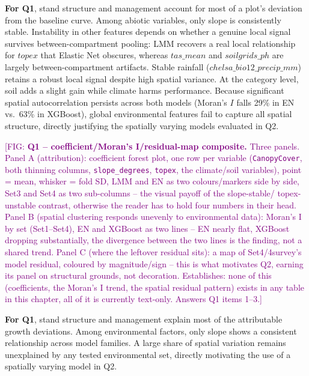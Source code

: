 \documentclass[logo,msc,ai]{infthesis}           %
\newcommand{\fig}[1]{\textcolor{purple}{[FIG: #1]}}
\begin{document}
\textbf{For Q1}, stand structure and management account for most of a plot's deviation from the baseline curve. Among abiotic variables, only slope is consistently stable. Instability in other features depends on whether a genuine local signal survives between-compartment pooling: LMM recovers a real local relationship for $\mathit{topex}$ that Elastic Net obscures, whereas $\mathit{tas\_mean}$ and $\mathit{soilgrids\_ph}$ are largely between-compartment artifacts. Stable rainfall ($\mathit{chelsa\_bio12\_precip\_mm}$) retains a robust local signal despite high spatial variance. At the category level, soil adds a slight gain while climate harms performance. Because significant spatial autocorrelation persists across both models (Moran's $I$ falls 29\% in EN vs.\ 63\% in XGBoost), global environmental features fail to capture all spatial structure, directly justifying the spatially varying models evaluated in Q2.


\fig{\textbf{Q1 -- coefficient/Moran's I/residual-map composite.} Three panels.
Panel A (attribution): coefficient forest plot, one row per variable (\texttt{CanopyCover},
both thinning columns, \texttt{slope\_degrees}, \texttt{topex}, the climate/soil
variables), point = mean, whisker = fold SD, LMM and EN as two colours/markers side by
side, Set3 and Set4 as two sub-columns -- the visual payoff of the slope-stable/
topex-unstable contrast, otherwise the reader has to hold four numbers in their head.
Panel B (spatial clustering responds unevenly to environmental data): Moran's I by set
(Set1--Set4), EN and XGBoost as two lines -- EN nearly flat, XGBoost dropping
substantially, the divergence between the two lines is the finding, not a shared trend.
Panel C (where the leftover residual sits): a map of Set4/4survey's model residual,
coloured by magnitude/sign -- this is what motivates Q2, earning its panel on
structural grounds, not decoration. Establishes: none of this (coefficients, the
Moran's I trend, the spatial residual pattern) exists in any table in this chapter, all
of it is currently text-only. Answers Q1 items 1--3.}



\textbf{For Q1}, stand structure and management explain most of the attributable growth deviations. Among environmental factors, only slope shows a consistent relationship across model families. A large share of spatial variation remains unexplained by any tested environmental set, directly motivating the use of a spatially varying model in Q2.
\end{document}
